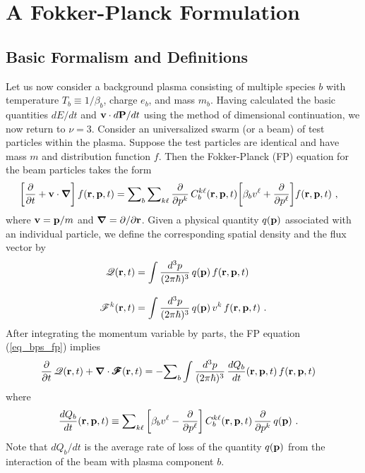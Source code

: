 \documentclass[preprint,12pt,eqsecnum,nofootinbib,amsmath,amssymb]{revtex4}
\begin{document}
\section{A Fokker-Planck Formulation}
\label{sec_fp_form}
 
\subsection{Basic Formalism and Definitions}
 
Let us now consider a background plasma consisting of multiple 
species $b$ with temperature $T_b \equiv 1/\beta_b$, charge 
$e_b$, and mass $m_b$. Having calculated the basic quantities 
$dE/dt$ and \hbox{${\bf v} \cdot d{\bf P}/dt$} using the method 
of dimensional continuation, we now return to $\nu=3$. Consider 
an universalized swarm (or a beam) of test particles within the 
plasma. Suppose the test particles are identical and have mass 
$m$ and distribution function $f$. Then the Fokker-Planck (FP) 
equation for the beam particles takes the form 
\begin{align}
  \left[
  \frac{\partial }{\partial t} + {\bf v} \cdot {\bm\nabla} 
  \right] f({\bf r}, {\bf p}, t)
  &=
  {\sum}_b\, {\sum}_{k\ell} \, 
  \frac{\partial}{\partial p^k} \, C_b^{k \ell}({\bf r}, {\bf p}, t)
  \bigg[ \beta_b v^\ell + \frac{\partial}{\partial p^\ell}
  \bigg] f({\bf r}, {\bf p}, t)
  \label{eq_bps_fp}
  \ ,
\end{align}
where ${\bf v} = {\bf p}/m$ and ${\bm\nabla} = \partial/\partial {\bf r}$. 
Given a physical quantity $q({\bf p})$ associated with an individual particle, 
we define the corresponding spatial density and the flux vector by
\begin{align}
  {\mathscr Q}({\bf r}, t)
  &=
  \int \frac{d^3 p}{(2\pi\hbar)^3}\, q({\bf p}) \, f({\bf r}, {\bf p}, t)
  \label{eq_q}
  \\[8pt]
  {\mathscr F}^k({\bf r}, t)
  &=
   \int \frac{d^3 p}{(2\pi\hbar)^3}\, q({\bf p}) \, v^k\, f({\bf r}, {\bf p}, t)
   \label{eq_fk}
  \ .
\end{align}
After integrating the momentum variable by parts, the FP equation 
(\ref{eq_bps_fp}) implies
\begin{align}
  \frac{\partial}{\partial t}\,{\mathscr Q}({\bf r}, t)
  +
  {\bm\nabla} \cdot \pmb{\mathscr{F}}({\bf r}, t)
  &=
  -{\sum}_b \int \frac{d^3 p}{(2\pi\hbar)^3} \,
  \frac{d Q_b}{dt}({\bf r}, {\bf p}, t) \, f({\bf r}, {\bf p}, t)
  \label{eq_q_continuity}
 \end{align}
where
\begin{align}
  \frac{d Q_b}{dt}({\bf r}, {\bf p},  t) 
  &\equiv
  {\sum}_{k \ell}
  \left[ \beta_b v^\ell - \frac{\partial}{\partial p^\ell}\right]
  C_b^{k \ell }({\bf r}, {\bf p}, t) \,\frac{\partial }{\partial p^k}\,q({\bf p})
  \ .
  \label{eq_q_dQdt}
\end{align}
Note that $dQ_b/dt$ is the average rate of loss of the quantity
$q({\bf p})$ from the interaction of the beam with plasma component 
$b$. 
\end{document}
